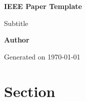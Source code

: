 \documentclass[10pt,conference,compsoc]{IEEEtran}
\begin{document}
\begin{titlepage}
  \begin{center}
    \vspace*{1cm}

    \Huge
    \textbf{IEEE Paper Template}

    \vspace{0.5cm}
    \LARGE
    Subtitle

    \vspace{1.5cm}

    \textbf{Author}

    \vspace{1.5cm}
    \normalsize
    Generated on \monthdayyeardate\today

    \vfill

    \vspace{0.8cm}
  \end{center}

  \vfill

  \vspace{0.8cm}
\end{titlepage}
\thispagestyle{empty}  %

\renewcommand\contentsname{Table of Contents}
\tableofcontents
\listoffigures
\listoftables
\listofsnippets
\thispagestyle{empty}  %
\clearpage


\section{Section}
\end{document}
